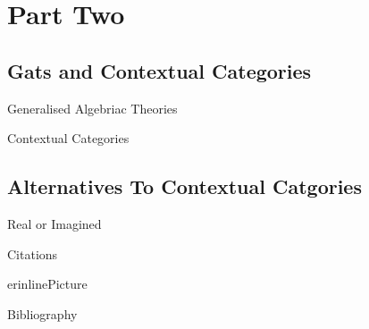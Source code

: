 \documentclass{beamer}
\renewcommand{\erpictureFolder}[0]{../SharedPictures}
\begin{document}
\section{Part Two}
\subsection{Gats and Contextual Categories}
\begin{frame}{Generalised Algebriac Theories}
\end{frame}
\begin{frame}{Contextual Categories}
\end{frame}
\subsection{Alternatives To Contextual Catgories}
\begin{frame}{Real or Imagined}
\end{frame}

\begin{frame}{Citations}
\cite{Cartmell78}
\nocite{erhard88}
\end{frame}

\begin{frame}{erinlinePicture}

\end{frame}

\begin{frame}{Bibliography}

\end{frame}
\end{document}

